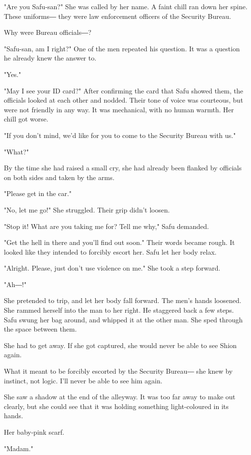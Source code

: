 "Are you Safu-san?" She was called by her name. A faint chill ran down
her spine. These uniforms― they were law enforcement officers of the
Security Bureau.

Why were Bureau officials―?

"Safu-san, am I right?" One of the men repeated his question. It was a
question he already knew the answer to.

"Yes."

"May I see your ID card?" After confirming the card that Safu showed
them, the officials looked at each other and nodded. Their tone of voice
was courteous, but were not friendly in any way. It was mechanical, with
no human warmth. Her chill got worse.

"If you don't mind, we'd like for you to come to the Security Bureau
with us."

"What?"

By the time she had raised a small cry, she had already been flanked by
officials on both sides and taken by the arms.

"Please get in the car."

"No, let me go!" She struggled. Their grip didn't loosen.

"Stop it! What are you taking me for? Tell me why," Safu demanded.

"Get the hell in there and you'll find out soon." Their words became
rough. It looked like they intended to forcibly escort her. Safu let her
body relax.

"Alright. Please, just don't use violence on me." She took a step
forward.

"Ah―!"

She pretended to trip, and let her body fall forward. The men's hands
loosened. She rammed herself into the man to her right. He staggered
back a few steps. Safu swung her bag around, and whipped it at the other
man. She sped through the space between them.

She had to get away. If she got captured, she would never be able to see
Shion again.

What it meant to be forcibly escorted by the Security Bureau― she knew
by instinct, not logic. I'll never be able to see him again.

She saw a shadow at the end of the alleyway. It was too far away to make
out clearly, but she could see that it was holding something
light-coloured in its hands.

Her baby-pink scarf.

"Madam."

